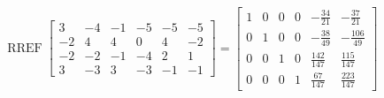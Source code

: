 \begin{exerciseAnswer} 


\[\operatorname{RREF} \left[\begin{array}{cccccc}
3 & -4 & -1 & -5 & -5 & -5 \\
-2 & 4 & 4 & 0 & 4 & -2 \\
-2 & -2 & -1 & -4 & 2 & 1 \\
3 & -3 & 3 & -3 & -1 & -1
\end{array}\right] = \left[\begin{array}{cccccc}
1 & 0 & 0 & 0 & -\frac{34}{21} & -\frac{37}{21} \\
0 & 1 & 0 & 0 & -\frac{38}{49} & -\frac{106}{49} \\
0 & 0 & 1 & 0 & \frac{142}{147} & \frac{115}{147} \\
0 & 0 & 0 & 1 & \frac{67}{147} & \frac{223}{147}
\end{array}\right] \]



\end{exerciseAnswer}
